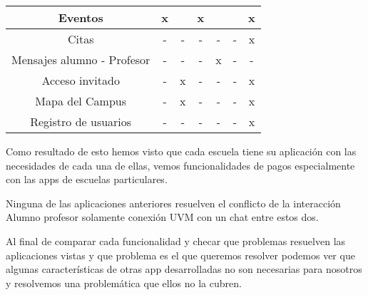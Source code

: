 \begin{table}[]
\begin{tabular}{@{}|c|c|c|c|c|c|c|@{}}
Eventos                    & x                                                      &                                                       & x                                                      &                                                         &                                                          & x          \\ \midrule
Citas                      & -                                                      & -                                                     & -                                                      & -                                                       & -                                                        & x          \\ \midrule
Mensajes alumno - Profesor & -                                                      & -                                                     & -                                                      & x                                                       & -                                                        & -          \\ \midrule
Acceso invitado            & -                                                      & x                                                     & -                                                      & -                                                       & -                                                        & x          \\ \midrule
Mapa del Campus            & -                                                      & x                                                     & -                                                      & -                                                       & -                                                        & x          \\ \midrule
Registro de usuarios       & -                                                      & -                                                     & -                                                      & -                                                       & -                                                        & x          \\ \bottomrule
\end{tabular}
\end{table}




Como resultado de esto hemos visto que cada escuela tiene su aplicación con las necesidades de cada una de ellas, vemos funcionalidades de pagos especialmente con las apps de escuelas particulares.

Ninguna de las aplicaciones anteriores resuelven el conflicto de la interacción Alumno profesor solamente conexión UVM con un chat entre estos dos.

Al final de comparar cada funcionalidad y checar que problemas resuelven las aplicaciones vistas y que problema es el que queremos resolver podemos ver que algunas características de otras app desarrolladas no son necesarias para nosotros y resolvemos una problemática que ellos no la cubren.
